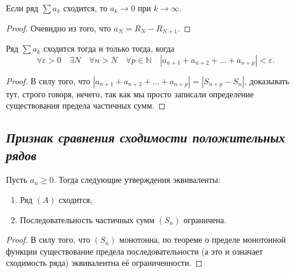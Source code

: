 \hypertarget{необходимое условие сходимости}{}
\begin{corollary}
	Если ряд \(\sum a_k\) сходится, то \(a_k \to 0\) при \(k \to \infty\).
\end{corollary}
\begin{proof}
	Очевидно из того, что \(a_N = R_N - R_{N+1}\).
\end{proof}

\begin{theorem}
	Ряд \(\sum a_k\) сходится тогда и только тогда, когда \[
	\forall \varepsilon > 0 \quad \exists N \quad \forall n > N \quad \forall p \in \mathbb{N} \quad |a_{n+1} + a_{n+2} + \ldots + a_{n+p}| < \varepsilon.
	\]
\end{theorem}
\begin{proof}
	В силу того, что \(|a_{n+1} + a_{n+2} + \ldots + a_{n+p}| = |S_{n + p} - S_n|\), доказывать тут, строго говоря, нечего, так как мы просто записали определение существования предела частичных сумм.
\end{proof}

\subsection{\itshape Признак сравнения сходимости положительных рядов}

\begin{lemma}
	Пусть \(a_n \geqslant 0\). Тогда следующие утверждения эквиваленты:
	\begin{enumerate}
		\item Ряд \((A)\) сходится,
		\item Последовательность частичных сумм \((S_n)\) ограничена.
	\end{enumerate}
\end{lemma}
\begin{proof}
	В силу того, что \((S_n)\) монотонна, по теореме о пределе монотонной функции существование предела последовательности (а это и означает сходимость ряда) эквивалентна её ограниченности.
\end{proof}

